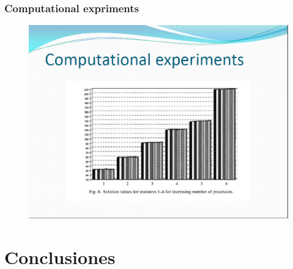 \documentclass{beamer}
\begin{document}
\begin{frame}
\frametitle{Computational expriments }
\begin{figure}[!th]
\begin{center}
\includegraphics[width=1\textwidth]{img/pic14.eps}
\end{center}
\end{figure}
\end{frame}
\section{Conclusiones}

\end{document}
